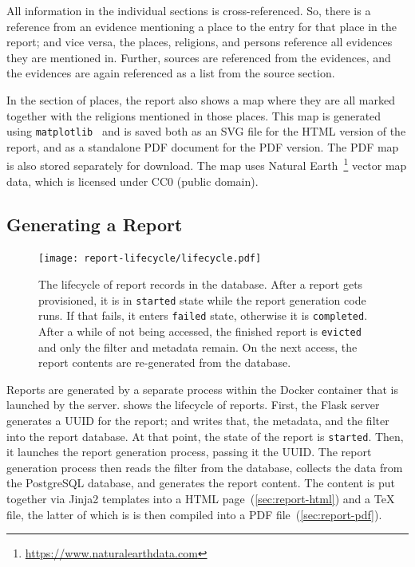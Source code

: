 All information in the individual sections is cross-referenced.
So, there is a reference from an evidence mentioning a place to the entry for that place in the report;
and vice versa, the places, religions, and persons reference all evidences they are mentioned in.
Further, sources are referenced from the evidences, and the evidences are again referenced as a list from the source section.

In the section of places, the report also shows a map where they are all marked together with the religions mentioned in those places.
This map is generated using \verb!matplotlib!~\cite{Hunter_2007} and is saved both as an SVG file for the HTML version of the report, and as a standalone PDF document for the PDF version.
The PDF map is also stored separately for download.
The map uses Natural Earth~\footnote{\url{https://www.naturalearthdata.com}} vector map data, which is licensed under CC0 (public domain).


\subsection{Generating a Report}
\label{sec:report-generation}
\label{sec:report-lifecycle}

\begin{figure}[tbp]
  \centering
  \texttt{[image: report-lifecycle/lifecycle.pdf]}

  \caption{
    The lifecycle of report records in the database.
    After a report gets provisioned, it is in \texttt{started} state while the report generation code runs.
    If that fails, it enters \texttt{failed} state, otherwise it is \texttt{completed}.
    After a while of not being accessed, the finished report is \texttt{evicted} and only the filter and metadata remain.
    On the next access, the report contents are re-generated from the database.
  }
  \label{fig:report-lifecycle}
\end{figure}


Reports are generated by a separate process within the Docker container that is launched by the server.
 shows the lifecycle of reports.
First, the Flask server generates a UUID for the report; and writes that, the metadata, and the filter into the report database.
At that point, the state of the report is \verb!started!.
Then, it launches the report generation process, passing it the UUID.
The report generation process then reads the filter from the database, collects the data from the PostgreSQL database, and generates the report content.
The content is put together via Jinja2 templates into a HTML page~(\cref{sec:report-html}) and a \TeX{} file, the latter of which is is then compiled into a PDF file~(\cref{sec:report-pdf}).

